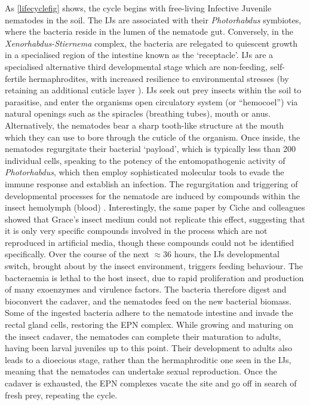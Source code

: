 As \vref{lifecyclefig} shows, the cycle begins with free-living Infective Juvenile nematodes in the soil. The IJs are associated with their \emph{Photorhabdus} symbiotes, where the bacteria reside in the lumen of the nematode gut. Conversely, in the \emph{Xenorhabdus-Stiernema} complex, the bacteria are relegated to quiescent growth in a specialised region of the intestine known as the `receptacle'. IJs are a specialised alternative third developmental stage which are non-feeding, self-fertile hermaphrodites, with increased resilience to environmental stresses (by retaining an additional cuticle layer \citep{Ciche2003a}). IJs seek out prey insects within the soil to parasitise, and enter the organisms open circulatory system (or ``hemocoel'') via natural openings such as the spiracles (breathing tubes), mouth or anus. Alternatively, the nematodes bear a sharp tooth-like structure at the mouth which they can use to bore through the cuticle of the organism. Once inside, the nematodes regurgitate their bacterial `payload', which is typically less than 200 individual cells, speaking to the potency of the entomopathogenic activity of \emph{Photorhabdus}, which then employ sophisticated molecular tools to evade the immune response and establish an infection. The regurgitation and triggering of developmental processes for the nematode are induced by compounds within the insect hemolymph (blood) \citep{Ciche2003a}. Interestingly, the same paper by Ciche and colleagues showed that Grace's insect medium could not replicate this effect, suggesting that it is only very specific compounds involved in the process which are not reproduced in artificial media, though these compounds could not be identified specifically. Over the course of the next $\approx$36 hours, the IJs developmental switch, brought about by the insect environment, triggers feeding behaviour. The bacteraemia is lethal to the host insect, due to rapid proliferation and production of many exoenzymes and virulence factors. The bacteria therefore digest and bioconvert the cadaver, and the nematodes feed on the new bacterial biomass. Some of the ingested bacteria adhere to the nematode intestine and invade the rectal gland cells, restoring the EPN complex. While growing and maturing on the insect cadaver, the nematodes can complete their maturation to adults, having been larval juveniles up to this point. Their development to adults also leads to a dioecious stage, rather than the hermaphroditic one seen in the IJs, meaning that the nematodes can undertake sexual reproduction. Once the cadaver is exhausted, the EPN complexes vacate the site and go off in search of fresh prey, repeating the cycle.

